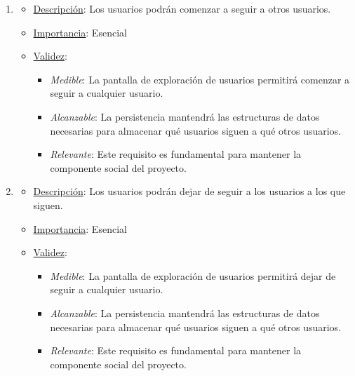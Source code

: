 \begin{enumerate}
\item %
  \begin{itemize}
  \item \underline{Descripción}: Los usuarios podrán comenzar a seguir a otros usuarios.
  \item \underline{Importancia}: Esencial
  \item \underline{Validez}:
    \begin{itemize}
    \item \textit{Medible}: La pantalla de exploración de usuarios permitirá comenzar a seguir a cualquier usuario.
    \item \textit{Alcanzable}: La persistencia mantendrá las estructuras de datos necesarias para almacenar qué usuarios siguen a qué otros usuarios.
    \item \textit{Relevante}: Este requisito es fundamental para mantener la componente social del proyecto.
    \end{itemize}
  \end{itemize}

\item %
  \begin{itemize}
  \item \underline{Descripción}: Los usuarios podrán dejar de seguir a los usuarios a los que siguen.
  \item \underline{Importancia}: Esencial
  \item \underline{Validez}:
    \begin{itemize}
    \item \textit{Medible}: La pantalla de exploración de usuarios permitirá dejar de seguir a cualquier usuario.
    \item \textit{Alcanzable}: La persistencia mantendrá las estructuras de datos necesarias para almacenar qué usuarios siguen a qué otros usuarios.
    \item \textit{Relevante}: Este requisito es fundamental para mantener la componente social del proyecto.
    \end{itemize}
  \end{itemize}


\end{enumerate}

